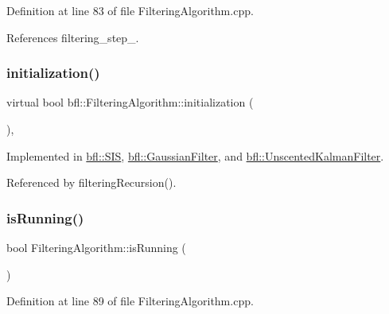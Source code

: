 Definition at line 83 of file Filtering\+Algorithm.\+cpp.



References filtering\+\_\+step\+\_\+.

\mbox{\label{classbfl_1_1FilteringAlgorithm_adebe2ec2372f97a2a5baecf8c2c2a9c9}} 
\subsubsection{\texorpdfstring{initialization()}{initialization()}}
{\footnotesize\ttfamily virtual bool bfl\+::\+Filtering\+Algorithm\+::initialization (\begin{DoxyParamCaption}{ }\end{DoxyParamCaption})\hspace{0.3cm}{\ttfamily [protected]}, {}}



Implemented in \mbox{\hyperlink{classbfl_1_1SIS_a59e4f35fc05d2088e6dc13d622cafd1d}{bfl\+::\+S\+IS}}, \mbox{\hyperlink{classbfl_1_1GaussianFilter_ac0305fa835af89ba5962ee1211d4d0c0}{bfl\+::\+Gaussian\+Filter}}, and \mbox{\hyperlink{classbfl_1_1UnscentedKalmanFilter_ad221e4abd58c2e67e9b44f52a0c9504f}{bfl\+::\+Unscented\+Kalman\+Filter}}.



Referenced by filtering\+Recursion().

\mbox{\label{classbfl_1_1FilteringAlgorithm_a5cfecab2c778620e2557237472bb1721}} 
\subsubsection{\texorpdfstring{is\+Running()}{isRunning()}}
{\footnotesize\ttfamily bool Filtering\+Algorithm\+::is\+Running (\begin{DoxyParamCaption}{ }\end{DoxyParamCaption})}



Definition at line 89 of file Filtering\+Algorithm.\+cpp.



